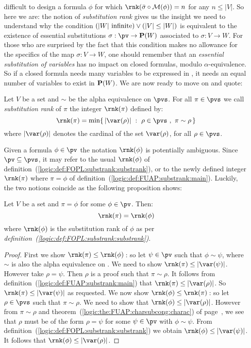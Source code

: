 difficult to design a formula $\phi$ for which
$\rnk(\bar{\sigma}\circ{\cal M}(\phi))=n$ for any $n\leq |V|$. So
here we are: the notion of {\em substitution rank} gives us the
insight we need to understand why the condition $(|W|\mbox{\
infinite})\lor(|V|\leq|W|)$ is equivalent to the existence of
essential substitutions $\sigma:\pv\to{\bf P}(W)$ associated to
$\sigma:V\to W$. For those who are surprised by the fact that this
condition makes no allowance for the specifics of the map
$\sigma:V\to W$, one should remember that an {\em essential
substitution of variables} has no impact on closed formulas, modulo
$\alpha$-equivalence. So if a closed formula needs many variables to
be expressed in \pv, it needs an equal number of variables to exist
in ${\bf P}(W)$. We are now ready to move on and quote:

\begin{defin}\label{logic:def:FUAP:substrank:main}
Let $V$ be a set and $\sim$ be the alpha equivalence on
$\pvs$. For all $\pi\in\pvs$ we call {\em substitution rank} of
$\pi$ the integer $\rnk(\pi)$ defined by:
    \[
    \rnk(\pi)=\min\{\,|\var(\rho)|\ :\
    \rho\in\pvs\ ,\ \pi\sim\rho\,\}
    \]
where $|\var(\rho)|$ denotes the cardinal of the set $\var(\rho)$,
for all $\rho\in\pvs$.
\end{defin}

Given a formula $\phi\in\pv$ the notation $\rnk(\phi)$ is
potentially ambiguous. Since $\pv\subseteq\pvs$, it may refer to the
usual $\rnk(\phi)$ of
definition~(\ref{logic:def:FOPL:substrank:substrank}), or to the
newly defined integer $\rnk(\pi)$ where $\pi=\phi$ of
definition~(\ref{logic:def:FUAP:substrank:main}). Luckily, the two
notions coincide as the following proposition shows:


\begin{prop}\label{logic:prop:FUAP:substrank:recursion:formula}
Let $V$ be a set and $\pi=\phi$ for some $\phi\in\pv$. Then:
    \[
    \rnk(\pi)=\rnk(\phi)
    \]
where $\rnk(\phi)$ is the substitution rank of $\phi$ as per {\em
definition~(\ref{logic:def:FOPL:substrank:substrank})}.
\end{prop}
\begin{proof}
First we show $\rnk(\pi)\leq\rnk(\phi)$\,: so let $\psi\in\pv$ such
that $\phi\sim\psi$, where $\sim$ is also the alpha equivalence on \pv. 
We need to show $\rnk(\pi)\leq|\var(\psi)|$.
However take $\rho=\psi$. Then $\rho$ is a proof such that
$\pi\sim\rho$. It follows from
definition~(\ref{logic:def:FUAP:substrank:main}) that
$\rnk(\pi)\leq|\var(\rho)|$. So $\rnk(\pi)\leq|\var(\psi)|$ as
requested. We now show $\rnk(\phi)\leq\rnk(\pi)$\,: so let
$\rho\in\pvs$ such that $\pi\sim\rho$. We need to show that
$\rnk(\phi)\leq|\var(\rho)|$. However from $\pi\sim\rho$ and
theorem~(\ref{logic:the:FUAP:charsubcong:charac}) of
page~\pageref{logic:the:FUAP:charsubcong:charac}, we see that $\rho$
must be of the form $\rho=\psi$ for some $\psi\in\pv$ with
$\phi\sim\psi$. From
definition~(\ref{logic:def:FOPL:substrank:substrank}) we obtain
$\rnk(\phi)\leq|\var(\psi)|$. It follows that
$\rnk(\phi)\leq|\var(\rho)|$.
\end{proof}


